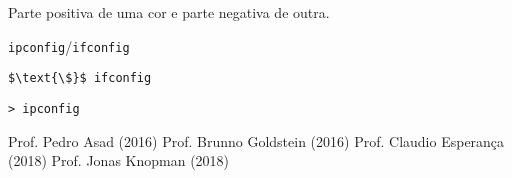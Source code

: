 \documentclass[12pt]{article}
\begin{document}
	
	Parte positiva de uma cor e parte negativa de outra.	
	
	
	
	\begin{interlude}{\texttt{ipconfig}/\texttt{ifconfig}}
	
	\begin{lstlisting}
$\text{\$}$ ifconfig
	\end{lstlisting}
	
	\begin{lstlisting}
> ipconfig
	\end{lstlisting}	
	
	\end{interlude}
	
	\begin{thebibliography}{99}
	 Prof. Pedro Asad (2016)
	 Prof. Brunno Goldstein (2016)
	 Prof. Claudio Esperança (2018)
	 Prof. Jonas Knopman (2018)
	\end{thebibliography}
\end{document}
